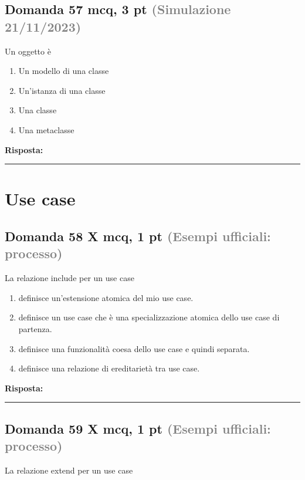 \documentclass[a4paper,11pt]{article}
\begin{document}
\subsection*{Domanda 57 \hfill {\small mcq, 3 pt \textcolor{gray}{(Simulazione 21/11/2023)}}}
Un oggetto è

\begin{enumerate}[label=\alph*)]
\item Un modello di una classe
\item Un'istanza di una classe
\item Una classe
\item Una metaclasse
\end{enumerate}
\vspace{0.2cm}
\noindent\textbf{Risposta:}\par
\vspace{1.5cm}\hrule


\section{Use case}

\subsection*{Domanda 58 X \hfill {\small mcq, 1 pt \textcolor{gray}{(Esempi ufficiali: processo)}}}
La relazione include per un use case

\begin{enumerate}[label=\alph*)]
\item definisce un'estensione atomica del mio use case.
\item definisce un use case che è una specializzazione atomica dello use case di partenza.
\item definisce una funzionalità coesa dello use case e quindi separata.
\item definisce una relazione di ereditarietà tra use case.
\end{enumerate}
\vspace{0.2cm}
\noindent\textbf{Risposta:}\par
\vspace{1.5cm}\hrule


\subsection*{Domanda 59 X \hfill {\small mcq, 1 pt \textcolor{gray}{(Esempi ufficiali: processo)}}}
La relazione extend per un use case
\end{document}
